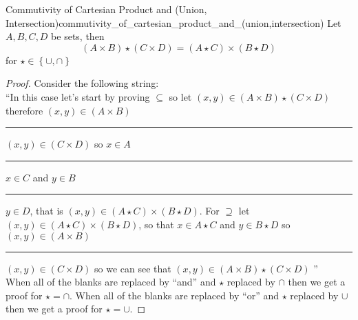 \begin{proposition}
{Commutivity of Cartesian Product and
(Union,
Intersection)}{commutivity_of_cartesian_product_and_(union,intersection)}
Let \(A, B, C, D \) be sets, then
\[
\left(A \times B\right) \star \left(C \times D\right) = \left(A \star C
\right) \times \left(B \star D\right)
\]
for \(\star \in \left\{\cup, \cap \right\} \)
\end{proposition}
\begin{proof}
    Consider the following string: \\
    ``In this case let's start by proving \( \subseteq  \) so
    let  \(\left(x, y\right) \in \left(A \times B\right)
    \star \left(C \times D\right) \) therefore \(\left(x,y\right) \in \left(A
    \times B
    \right) \) \rule{.5cm}{0.15mm} \(\left(x,y\right) \in \left(C
    \times D\right) \) so \(x \in A \) \rule{.5cm}{0.15mm} \(x \in C
    \) and \(y \in B \)
    \rule{.5cm}{0.15mm} \(y \in D \), that
    is \(\left(x, y\right) \in \left(A \star C\right) \times \left(B
    \star D\right) \). For \( \supseteq  \) let \( \left( x, y \right) \in \left(
    A \star C\right) \times \left( B \star D \right)  \), so that \( x \in A
    \star  C \) and \( y \in B \star D \) so \( \left( x ,y  \right) \in  \left(
    A \times B \right)  \) \rule{.5cm}{0.15mm} \( \left( x, y \right) \in
    \left( C \times D \right)  \) so we can see that \( \left( x, y  \right) \in
    \left( A \times B \right) \star  \left( C \times D\right)  \) ''\\
    When all of the blanks are replaced by ``and'' and \( \star  \) replaced by
    \( \cap  \) then we get a proof for \( \star = \cap  \). When all of the
    blanks are replaced by ``or'' and \( \star  \) replaced by \( \cup  \) then
    we get a proof for \( \star = \cup  \).
\end{proof}
